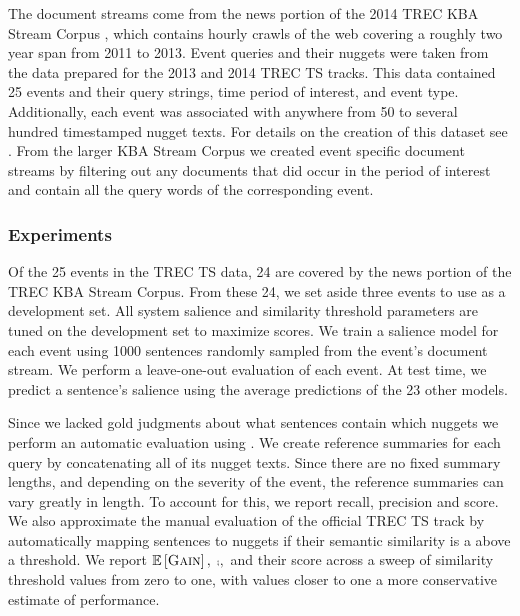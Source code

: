     
  The document streams come from the news portion of the 2014 TREC
KBA Stream Corpus \citep{frank2012building}, which contains hourly crawls
of the web covering a roughly two year span from 2011 to 2013.
Event queries and their nuggets were taken from the data prepared for 
the 2013 and 2014 TREC TS tracks. This data
contained 25 events and their query strings, time period of interest, and
event type. 
Additionally, each event was associated with anywhere from 50 to several
hundred timestamped nugget texts. 
For details on the creation of this dataset see \cite{aslam2014trec,aslam2015trec}.
From the larger KBA Stream Corpus we created event specific document 
streams by filtering out any documents that did occur in the period
of interest and contain all the query words of the corresponding event.  



    \subsubsection{Experiments}

    

Of the 25 events in the TREC TS data, 24 are
covered by the news portion of the TREC KBA
Stream Corpus. From these 24, we set aside
three events to use as a development set. All
system salience and similarity threshold parameters
are tuned on the development set to maximize
 \fmeasure{} scores.
We train a salience model for each event using
1000 sentences randomly sampled from the
event's document stream.
We perform a leave-one-out evaluation of each
event. At test time, we predict a sentence's
salience using the average predictions of the 23
other models.



    Since we lacked gold judgments about what sentences contain which nuggets
    we perform an automatic evaluation using \rouge{} \citep{lin2004rouge}. We 
    create reference summaries for each query by concatenating all 
    of its nugget texts.
    Since there are no fixed summary lengths, and depending on the severity
    of the event, the reference summaries can vary greatly in length.
    To account for this, we report \rouge{} recall, precision and \fmeasure{}
    score.
We also approximate the manual evaluation of the official TREC TS track
    by automatically mapping sentences to nuggets if their semantic similarity
    is a above a threshold. 
    We report $\mathbb{E}\left[\textsc{Gain}\right],$ $\comp,$ and their \fmeasure{} score
    across a sweep of similarity threshold 
    values from zero to one, with values closer to one a more conservative
    estimate of performance.     


